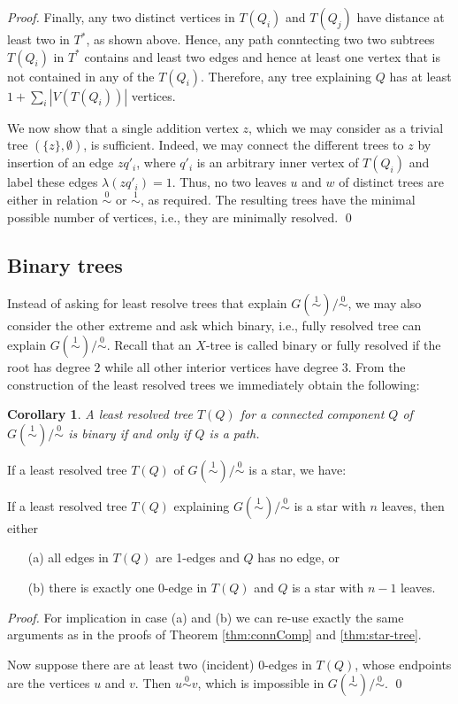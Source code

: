 \documentclass[smallextended]{svjour3}
\newcommand{\Ro}{\mathrel{\overset{0}{\sim}}}
\newcommand{\Rl}{\mathrel{\overset{1}{\sim}}}
\newtheorem{cor}[thm]{Corollary}
\begin{document}
\begin{proof}
{  Finally, any two distinct vertices in $T(Q_i)$ and $T(Q_j)$ have distance
  at least two in $T^*$, as shown above. Hence, any path conntecting two
  two subtrees $T(Q_i)$ in $T^*$ contains and least two edges and hence at
  least one vertex that is not contained in any of the $T(Q_i)$. Therefore,
  any tree explaining $Q$ has at least $1+\sum_i |V(T(Q_i))|$ vertices.

  We now show that a single addition vertex $z$, which we may consider as a
  trivial tree $(\{z\},\emptyset)$, is sufficient. Indeed, we may connect
  the different trees to $z$ by insertion of an edge $zq'_i$, where $q'_i$
  is an arbitrary inner vertex of $T(Q_i)$ and label these edges
  $\lambda(zq'_i)=1$.  Thus, no two leaves $u$ and $w$ of distinct trees
  are either in relation $\Ro$ or $\Rl$, as required. The resulting trees 
  have the minimal possible number of vertices, i.e., they are minimally
  resolved. 
  \qed}
\end{proof}

\subsection*{Binary trees}

Instead of asking for least resolve trees that explain $G(\Rl)/\Ro$, we may
also consider the other extreme and ask which binary, i.e., fully resolved
tree can explain $G(\Rl)/\Ro$. Recall that an $X$-tree is called binary or
fully resolved if the root has degree $2$ while all other interior vertices
have degree $3$.  From the construction of the least resolved trees we
immediately obtain the following:
\begin{cor}
  A least resolved tree $T(Q)$ for a connected component $Q$ of
  $G(\Rl)/\Ro$ is binary if and only if $Q$ is a path.
\end{cor}

If a least resolved tree $T(Q)$ of $G(\Rl)/\Ro$ is a star, we have:
\begin{lemma}\label{lem:star}
  If a least resolved tree $T(Q)$ explaining $G(\Rl)/\Ro$ is a star
  with $n$ leaves, then either
  \begin{itemize}
    \item[(a)] all edges in $T(Q)$ are 1-edges and $Q$ has no edge, or 
    \item[(b)] there is exactly one 0-edge in $T(Q)$ and $Q$ is a star
        with $n-1$ leaves.
    \end{itemize}
  \end{lemma}
\begin{proof}
  For implication in case (a) and (b) we can re-use exactly the same
  arguments as in the proofs of Theorem \ref{thm:connComp} and
  \ref{thm:star-tree}.

  Now suppose there are at least two (incident) 0-edges in $T(Q)$, whose
  endpoints are the vertices $u$ and $v$. Then $u\Ro v$, which is
  impossible in $G(\Rl)/\Ro$.  \qed
\end{proof}
\end{document}
